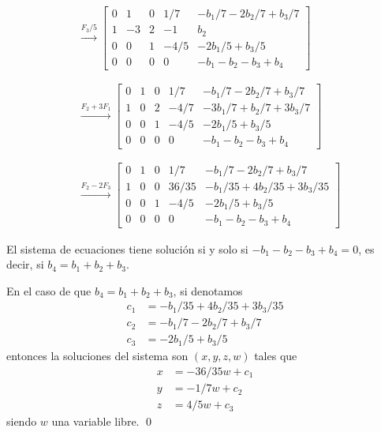 \documentclass[handout]{beamer} %
\renewcommand{\_}[1]{_{\left[ #1 \right]}}
\renewcommand{\^}[1]{^{\left[ #1 \right]}}
\begin{document}
\begin{frame}

    {\footnotesize
    \begin{align*}
        &\stackrel{F_3/5}{\longrightarrow}
        \left[
            \begin{array}{cccc|c}
                0 & 1 & 0 & 1/7 & -b_1/7 -2 b_2/7 + b_3/7 \\
                1 & -3 & 2 & -1 & b_2 \\
                0 & 0 & 1 & -4/5 &-2b_1/5 + b_3/5 \\
                0 & 0 & 0 & 0 & -b_1 - b_2 - b_3 + b_4
            \end{array}
        \right]
        \\
        &{}^{}
        \\
        &\stackrel{F_2+3F_1}{\longrightarrow}
        \left[
            \begin{array}{cccc|c}
                0 & 1 & 0 & 1/7 & -b_1/7 -2 b_2/7 + b_3/7 \\
                1 & 0 & 2 & -4/7 & -3b_1/7 + b_2/7 + 3b_3/7 \\
                0 & 0 & 1 & -4/5 &-2b_1/5 + b_3/5 \\
                0 & 0 & 0 & 0 & -b_1 - b_2 - b_3 + b_4
            \end{array}
        \right]
        \\
        &{}^{}
        \\
        &\stackrel{F_2-2F_3}{\longrightarrow}
        \left[
            \begin{array}{cccc|c}
                0 & 1 & 0 & 1/7 & -b_1/7 -2 b_2/7 + b_3/7 \\
                1 & 0 & 0 & 36/35 & -b_1/35 + 4b_2/35 + 3b_3/35 \\
                0 & 0 & 1 & -4/5 &-2b_1/5 + b_3/5 \\
                0 & 0 & 0 & 0 & -b_1 - b_2 - b_3 + b_4
            \end{array}
        \right]
    \end{align*}
    }
\end{frame}

\begin{frame}
    El sistema de ecuaciones tiene solución si y solo si $-b_1 - b_2 - b_3 + b_4 = 0$,  es decir, si $b_4 = b_1 + b_2 + b_3$.
    
    En  el caso de que $b_4 = b_1 + b_2 + b_3$, si denotamos
    \begin{align*}
        c_1 &= -b_1/35 + 4b_2/35 + 3b_3/35 \\
        c_2 &= -b_1/7 -2 b_2/7 + b_3/7 \\
        c_3 &= -2b_1/5 + b_3/5
    \end{align*}
    entonces la soluciones del sistema son $(x,y,z,w)$ tales que
    \begin{align*}
        x &= -36/35w + c_1\\
        y &= -1/7 w + c_2 \\
        z &= 4/5 w + c_3
    \end{align*}
    siendo $w$ una variable libre.
\qed

\end{frame}
\end{document}
